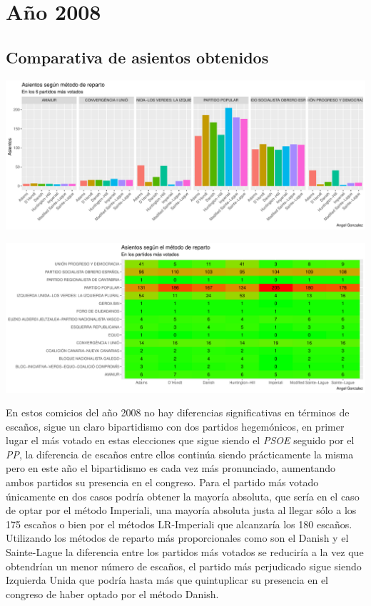 \documentclass[12pt,a4paper,]{book}
\numberwithin{dummy}{section}
\theoremstyle{ocrenumbox}
\theoremstyle{blacknumex}
\theoremstyle{blacknumbox}
\theoremstyle{ocrenum}
\theoremstyle{ocrenum}
\begin{document}
\hypertarget{auxf1o-2008}{%
\section{Año 2008}\label{auxf1o-2008}}

\hypertarget{comparativa-de-asientos-obtenidos-9}{%
\subsection{Comparativa de asientos
obtenidos}\label{comparativa-de-asientos-obtenidos-9}}

\begin{center}\includegraphics[width=1\linewidth]{figurasR/unnamed-chunk-100-1} \end{center}

\begin{center}\includegraphics[width=1\linewidth]{figurasR/unnamed-chunk-100-2} \end{center}

En estos comicios del año 2008 no hay diferencias significativas en
términos de escaños, sigue un claro bipartidismo con dos partidos
hegemónicos, en primer lugar el más votado en estas elecciones que sigue
siendo el \emph{PSOE} seguido por el \emph{PP}, la diferencia de escaños
entre ellos continúa siendo prácticamente la misma pero en este año el
bipartidismo es cada vez más pronunciado, aumentando ambos partidos su
presencia en el congreso. Para el partido más votado únicamente en dos
casos podría obtener la mayoría absoluta, que sería en el caso de optar
por el método Imperiali, una mayoría absoluta justa al llegar sólo a los
175 escaños o bien por el métodos LR-Imperiali que alcanzaría los 180
escaños. Utilizando los métodos de reparto más proporcionales como son
el Danish y el Sainte-Lague la diferencia entre los partidos más votados
se reduciría a la vez que obtendrían un menor número de escaños, el
partido más perjudicado sigue siendo Izquierda Unida que podría hasta
más que quintuplicar su presencia en el congreso de haber optado por el
método Danish.
\end{document}

